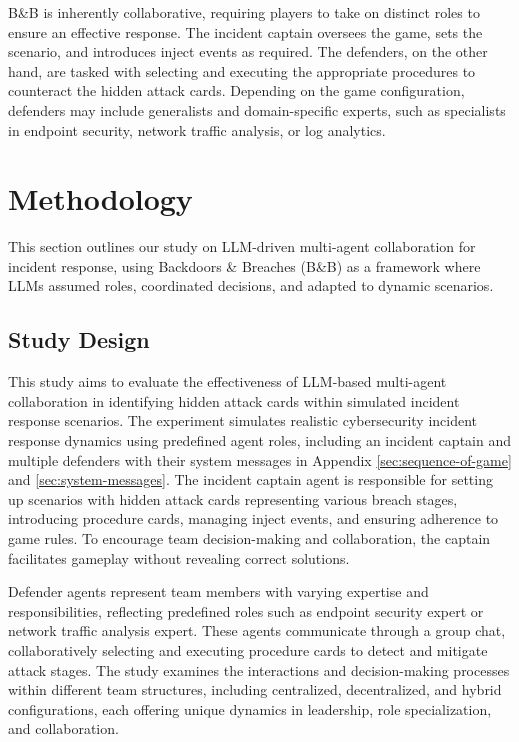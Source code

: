 \documentclass[letterpaper]{article} %
\begin{document}
B\&B is inherently collaborative, requiring players to take on distinct roles to ensure an effective response. The incident captain oversees the game, sets the scenario, and introduces inject events as required. The defenders, on the other hand, are tasked with selecting and executing the appropriate procedures to counteract the hidden attack cards. Depending on the game configuration, defenders may include generalists and domain-specific experts, such as specialists in endpoint security, network traffic analysis, or log analytics.

\section{Methodology}

This section outlines our study on LLM-driven multi-agent collaboration for incident response, using Backdoors \& Breaches (B\&B) as a framework where LLMs assumed roles, coordinated decisions, and adapted to dynamic scenarios.

\subsection{Study Design}

This study aims to evaluate the effectiveness of LLM-based multi-agent collaboration in identifying hidden attack cards within simulated incident response scenarios. The experiment simulates realistic cybersecurity incident response dynamics using predefined agent roles, including an incident captain and multiple defenders with their system messages in Appendix \ref{sec:sequence-of-game} and \ref{sec:system-messages}. The incident captain agent is responsible for setting up scenarios with hidden attack cards representing various breach stages, introducing procedure cards, managing inject events, and ensuring adherence to game rules. To encourage team decision-making and collaboration, the captain facilitates gameplay without revealing correct solutions.

Defender agents represent team members with varying expertise and responsibilities, reflecting predefined roles such as endpoint security expert or network traffic analysis expert. These agents communicate through a group chat, collaboratively selecting and executing procedure cards to detect and mitigate attack stages. The study examines the interactions and decision-making processes within different team structures, including centralized, decentralized, and hybrid configurations, each offering unique dynamics in leadership, role specialization, and collaboration.
\end{document}
